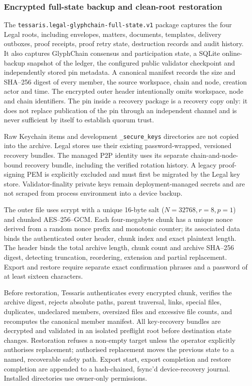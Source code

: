\subsubsection{Encrypted full-state backup and clean-root restoration}

The \texttt{tessaris.legal-glyphchain-full-state.v1} package captures the four
Legal roots, including envelopes, matters, documents, templates, delivery
outboxes, proof receipts, proof retry state, destruction records and audit
history. It also captures GlyphChain consensus and participation state, a
SQLite online-backup snapshot of the ledger, the configured public validator
checkpoint and independently stored pin metadata. A canonical manifest records
the size and SHA--256 digest of every member, the source workspace, chain and
node, creation actor and time. The encrypted outer header intentionally omits
workspace, node and chain identifiers. The pin inside a recovery package is a
recovery copy only: it does not replace publication of the pin through an
independent channel and is never sufficient by itself to establish quorum
trust.

Raw Keychain items and development \texttt{\_secure\_keys} directories are not
copied into the archive. Legal stores use their existing password-wrapped,
versioned recovery bundles. The managed P2P identity uses its separate
chain-and-node-bound recovery bundle, including the verified rotation history.
A legacy proof-signing PEM is explicitly excluded and must first be migrated by
the Legal key store. Validator-finality private keys remain deployment-managed
secrets and are not scraped from process environment into a device backup.

The outer file uses scrypt with a unique 16-byte salt
(\(N=32768,r=8,p=1\)) and chunked AES--256--GCM. Each four-megabyte chunk has a
unique nonce derived from a random nonce prefix and monotonic counter; its
associated data binds the authenticated outer header, chunk index and exact
plaintext length. The header binds the total archive length, chunk count and
archive SHA--256 digest, detecting truncation, reordering, extension and partial
replacement. Export and restore require separate exact confirmation phrases and
a password of at least sixteen characters.

Before restoration, Tessaris authenticates every encrypted chunk, verifies the
archive digest, rejects absolute paths, parent traversal, links, special files,
duplicates, undeclared members, oversized files and excessive file counts, and
recomputes the canonical member manifest. All key-recovery bundles are decrypted
and validated in an isolated preflight root before destination state changes.
Restoration refuses a non-empty target unless the operator explicitly authorises
replacement; authorised replacement moves the previous state to a named,
recoverable safety path. Export start, export completion and restore completion
are appended to a hash-chained, fsync'd device-recovery journal. Installed
directories use owner-only permissions.

